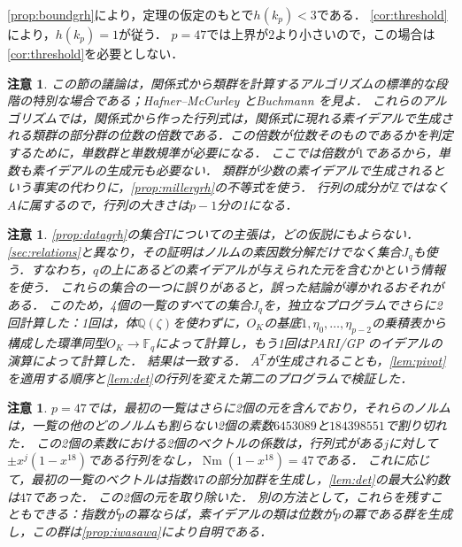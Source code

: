 \documentclass[11pt,a4paper]{ltjsarticle}
\makeatletter
\theoremstyle{ja}
\newtheorem{remark}[theorem]{注意}
\renewenvironment{proof}[1][証明]{\par
  \pushQED{\qed}\normalfont \topsep6\p@\@plus6\p@\relax
  \trivlist
  \item[\hskip\labelsep\bfseries #1]\hspace{1\zw}\ignorespaces
}{\popQED\endtrivlist\@endpefalse}
\makeatother
\begin{document}
\begin{proof}[\cref{thm:grh}の証明]
\cref{prop:boundgrh}により，定理の仮定のもとで$h(k_p) < 3$である．
\cref{cor:threshold}により，$h(k_p) = 1$が従う．
$p = 47$では上界が$2$より小さいので，この場合は\cref{cor:threshold}を必要としない．
\end{proof}

\begin{remark} \label{rem:standard}
この節の議論は，関係式から類群を計算するアルゴリズムの標準的な段階の特別な場合である；Hafner--McCurley \cite{HM89}とBuchmann \cite{Bu90}を見よ．
これらのアルゴリズムでは，関係式から作った行列式は，関係式に現れる素イデアルで生成される類群の部分群の位数の倍数である．この倍数が位数そのものであるかを判定するために，単数群と単数規準が必要になる．
ここでは倍数が$1$であるから，単数も素イデアルの生成元も必要ない．
類群が少数の素イデアルで生成されるという事実の代わりに，\cref{prop:millergrh}の不等式を使う．
行列の成分が$\mathbb{Z}$ではなく$A$に属するので，行列の大きさは$p - 1$分の1になる．
\end{remark}

\begin{remark} \label{rem:entries}
\cref{prop:datagrh}の集合$T$についての主張は，どの仮説にもよらない．
\cref{sec:relations}と異なり，その証明はノルムの素因数分解だけでなく集合$J_q$も使う．すなわち，$q$の上にあるどの素イデアルが与えられた元を含むかという情報を使う．
これらの集合の一つに誤りがあると，誤った結論が導かれるおそれがある．
このため，4個の一覧のすべての集合$J_q$を，独立なプログラムでさらに2回計算した：1回は，体$\mathbb{Q}(\zeta)$を使わずに，$O_K$の基底$1, \eta_0, \dots, \eta_{p-2}$の乗積表から構成した環準同型$O_K \to \mathbb{F}_q$によって計算し，もう1回はPARI/GP \cite{PARI}のイデアルの演算によって計算した．
結果は一致する．
$A^T$が生成されることも，\cref{lem:pivot}を適用する順序と\cref{lem:det}の行列を変えた第二のプログラムで検証した．
\end{remark}

\begin{remark} \label{rem:index}
$p = 47$では，最初の一覧はさらに2個の元を含んでおり，それらのノルムは，一覧の他のどのノルムも割らない2個の素数$6453089$と$184398551$で割り切れた．
この2個の素数における2個のベクトルの係数は，行列式がある$j$に対して$\pm x^j (1 - x^{18})$である行列をなし，$\operatorname{Nm}(1 - x^{18}) = 47$である．
これに応じて，最初の一覧のベクトルは指数$47$の部分加群を生成し，\cref{lem:det}の最大公約数は$47$であった．
この2個の元を取り除いた．
別の方法として，これらを残すこともできる：指数が$p$の冪ならば，素イデアルの類は位数が$p$の冪である群を生成し，この群は\cref{prop:iwasawa}により自明である．
\end{remark}
\end{document}
